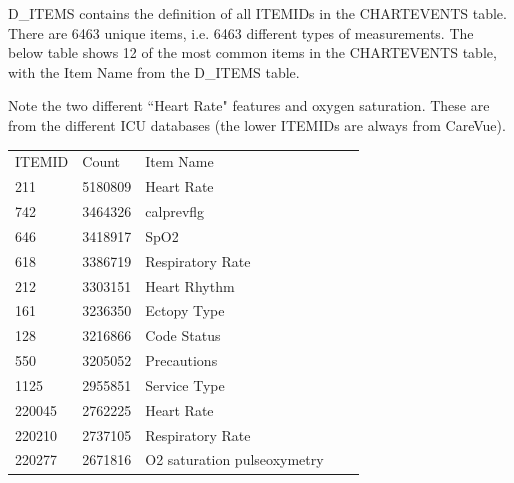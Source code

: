 \documentclass[12pt]{article}
\begin{document}
D\_ITEMS contains the definition of all ITEMIDs in the CHARTEVENTS table. There are 6463 unique items, i.e. 6463 different types of measurements. The below table shows 12 of the most common items in the CHARTEVENTS table, with the Item Name from the D\_ITEMS table.

Note the two different ``Heart Rate" features and oxygen saturation. These are from the different ICU databases (the lower ITEMIDs are always from CareVue).

\begin{center}
\captionsetup{type=table}
\begin{tabular}{|l|l|l|ll}
\cline{1-3}
ITEMID & Count   & Item Name                   &  &  \\ \cline{1-3}
211    & 5180809 & Heart Rate                  &  &  \\ \cline{1-3}
742    & 3464326 & calprevflg                  &  &  \\ \cline{1-3}
646    & 3418917 & SpO2                        &  &  \\ \cline{1-3}
618    & 3386719 & Respiratory Rate            &  &  \\ \cline{1-3}
212    & 3303151 & Heart Rhythm                &  &  \\ \cline{1-3}
161    & 3236350 & Ectopy Type                 &  &  \\ \cline{1-3}
128    & 3216866 & Code Status                 &  &  \\ \cline{1-3}
550    & 3205052 & Precautions                 &  &  \\ \cline{1-3}
1125   & 2955851 & Service Type                &  &  \\ \cline{1-3}
220045 & 2762225 & Heart Rate                  &  &  \\ \cline{1-3}
220210 & 2737105 & Respiratory Rate            &  &  \\ \cline{1-3}
220277 & 2671816 & O2 saturation pulseoxymetry &  &  \\ \cline{1-3}
\end{tabular}
\label{Most Common Items}
\end{center}
\end{document}
